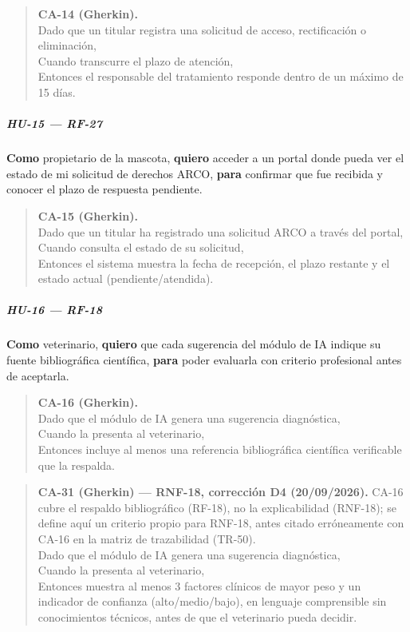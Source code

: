 \documentclass[
]{article}
\begin{document}
\begin{quote}
\textbf{CA-14 (Gherkin).} \\
Dado que un titular registra una solicitud de acceso, rectificación o eliminación, \\
Cuando transcurre el plazo de atención, \\
Entonces el responsable del tratamiento responde dentro de un máximo de 15 días.
\end{quote}

\subparagraph{HU-15 --- RF-27}
\textbf{Como} propietario de la mascota,
\textbf{quiero} acceder a un portal donde pueda ver el estado de mi solicitud de derechos ARCO,
\textbf{para} confirmar que fue recibida y conocer el plazo de respuesta pendiente.

\begin{quote}
\textbf{CA-15 (Gherkin).} \\
Dado que un titular ha registrado una solicitud ARCO a través del portal, \\
Cuando consulta el estado de su solicitud, \\
Entonces el sistema muestra la fecha de recepción, el plazo restante y el estado actual (pendiente/atendida).
\end{quote}

\subparagraph{HU-16 --- RF-18}
\textbf{Como} veterinario,
\textbf{quiero} que cada sugerencia del módulo de IA indique su fuente bibliográfica científica,
\textbf{para} poder evaluarla con criterio profesional antes de aceptarla.

\begin{quote}
\textbf{CA-16 (Gherkin).} \\
Dado que el módulo de IA genera una sugerencia diagnóstica, \\
Cuando la presenta al veterinario, \\
Entonces incluye al menos una referencia bibliográfica científica verificable que la respalda.
\end{quote}

\begin{quote}
\textbf{CA-31 (Gherkin) --- RNF-18, corrección D4 (20/09/2026).} CA-16
cubre el respaldo bibliográfico (RF-18), no la explicabilidad
(RNF-18); se define aquí un criterio propio para RNF-18, antes citado
erróneamente con CA-16 en la matriz de trazabilidad (TR-50). \\
Dado que el módulo de IA genera una sugerencia diagnóstica, \\
Cuando la presenta al veterinario, \\
Entonces muestra al menos 3 factores clínicos de mayor peso y un
indicador de confianza (alto/medio/bajo), en lenguaje comprensible sin
conocimientos técnicos, antes de que el veterinario pueda decidir.
\end{quote}
\end{document}
